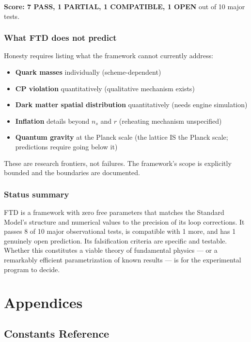 \documentclass[
  11pt,
  letterpaper,
  twoside,
  openany]{book}
\makeatletter
\providecommand{\tightlist}{%
  \setlength{\itemsep}{0pt}\setlength{\parskip}{0pt}}
\let\orig@section\section
\renewcommand{\section}{\needspace{8\baselineskip}\orig@section}
\makeatother
\begin{document}
\textbf{Score: 7 PASS, 1 PARTIAL, 1 COMPATIBLE, 1 OPEN} out of 10 major
tests.

\section{What FTD does not predict}\label{what-ftd-does-not-predict}

Honesty requires listing what the framework cannot currently address:

\begin{itemize}
\tightlist
\item
  \textbf{Quark masses} individually (scheme-dependent)
\item
  \textbf{CP violation} quantitatively (qualitative mechanism exists)
\item
  \textbf{Dark matter spatial distribution} quantitatively (needs engine
  simulation)
\item
  \textbf{Inflation} details beyond \(n_s\) and \(r\) (reheating
  mechanism unspecified)
\item
  \textbf{Quantum gravity} at the Planck scale (the lattice IS the
  Planck scale; predictions require going below it)
\end{itemize}

These are research frontiers, not failures. The framework's scope is
explicitly bounded and the boundaries are documented.

\section{Status summary}\label{status-summary}

FTD is a framework with zero free parameters that matches the Standard
Model's structure and numerical values to the precision of its loop
corrections. It passes 8 of 10 major observational tests, is compatible
with 1 more, and has 1 genuinely open prediction. Its falsification
criteria are specific and testable. Whether this constitutes a viable
theory of fundamental physics --- or a remarkably efficient
parametrization of known results --- is for the experimental program to
decide.

\part{Appendices}

\chapter{Constants Reference}\label{sec-constants-reference}
\end{document}

